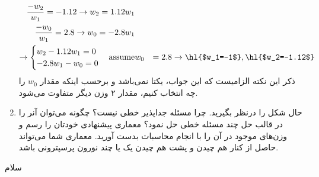 \begin{enumerate}
\begin{qsolve}
		
		\begin{eqnarray*}
			\frac{-w_2}{w_1}=-1.12 \rightarrow w_2=1.12w_1\\
			\frac{-w_0}{w_1}=2.8 \rightarrow w_0=-2.8w_1\\
			\rightarrow
			\begin{cases}
				w_2-1.12w_1=0\\
				-2.8w_1-w_0=0 
			\end{cases}
			\text{assume} &w_0&=2.8 \rightarrow \text{\hl{$w_1=-1$}}, \text{\hl{$w_2=-1.12$}}
		\end{eqnarray*}
		ذکر این نکته الزامیست که این جواب، یکتا نمی‌باشد و برحسب اینکه مقدار $w_0$ را چه انتخاب کنیم، مقدار ۲ وزن دیگر متفاوت می‌شود.
	\end{qsolve}
	
	
	
	
	
	
	
	
	
	
	
	
	
	
	
	
	
	
	
	\item حال شکل  را درنظر بگیرید. چرا مسئله جداپذیر خطی نیست؟ چگونه می‌توان آنر را در قالب حل چند مسئله خطی حل نمود؟ معماری پیشنهادی خودتان را رسم و وزن‌های موجود در آن را با انجام محاسبات بدست آورید. معماری شما می‌تواند حاصل از کنار هم چیدن و پشت هم چیدن یک یا چند نورون پرسپترونی باشد.
\end{enumerate}


\begin{qsolve}
	سلام
\end{qsolve}








